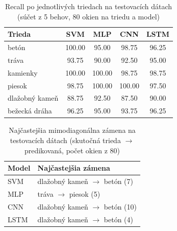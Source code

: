 \begin{table}[H]
    \centering
    \caption{Recall po jednotlivých triedach na testovacích dátach (súčet z 5 behov, 80 okien na triedu a model)}
    \label{tab:class-recall}
    \footnotesize
    \begin{tabular}{lcccc}
        \toprule
        Trieda & SVM & MLP & CNN & LSTM \\
        \midrule
        betón & 100.00 & 95.00 & 98.75 & 96.25 \\
        tráva & 93.75 & 90.00 & 92.50 & 95.00 \\
        kamienky & 100.00 & 100.00 & 98.75 & 98.75 \\
        piesok & 98.75 & 100.00 & 100.00 & 97.50 \\
        dlažobný kameň & 88.75 & 92.50 & 87.50 & 90.00 \\
        bežecká dráha & 96.25 & 95.00 & 93.75 & 96.25 \\
        \bottomrule
    \end{tabular}
\end{table}

\begin{table}[H]
    \centering
    \caption{Najčastejšia mimodiagonálna zámena na testovacích dátach (skutočná trieda $\rightarrow$ predikovaná, počet okien z 80)}
    \label{tab:class-confusion}
    \footnotesize
    \begin{tabular}{ll}
        \toprule
        Model & Najčastejšia zámena \\
        \midrule
        SVM & dlažobný kameň $\rightarrow$ betón (7) \\
        MLP & tráva $\rightarrow$ piesok (5) \\
        CNN & dlažobný kameň $\rightarrow$ betón (10) \\
        LSTM & dlažobný kameň $\rightarrow$ betón (4) \\
        \bottomrule
    \end{tabular}
\end{table}
